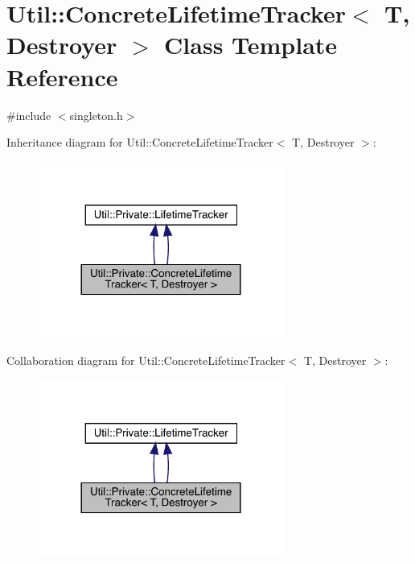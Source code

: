 \hypertarget{classUtil_1_1Private_1_1ConcreteLifetimeTracker}{}\section{Util\+:\+:Concrete\+Lifetime\+Tracker$<$ T, Destroyer $>$ Class Template Reference}
\label{classUtil_1_1Private_1_1ConcreteLifetimeTracker}


{\ttfamily \#include $<$singleton.\+h$>$}



Inheritance diagram for Util\+:\+:Concrete\+Lifetime\+Tracker$<$ T, Destroyer $>$\+:\nopagebreak
\begin{figure}[H]
\begin{center}
\leavevmode
\includegraphics[width=228pt]{d5/d11/classUtil_1_1Private_1_1ConcreteLifetimeTracker__inherit__graph}
\end{center}
\end{figure}


Collaboration diagram for Util\+:\+:Concrete\+Lifetime\+Tracker$<$ T, Destroyer $>$\+:\nopagebreak
\begin{figure}[H]
\begin{center}
\leavevmode
\includegraphics[width=228pt]{d9/db3/classUtil_1_1Private_1_1ConcreteLifetimeTracker__coll__graph}
\end{center}
\end{figure}

